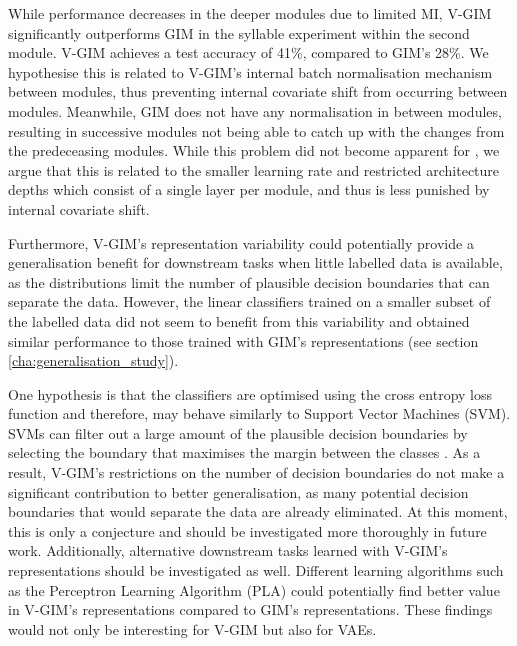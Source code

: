 	While performance decreases in the deeper modules due to limited MI, V-GIM significantly outperforms GIM in the syllable experiment within the second module. V-GIM achieves a test accuracy of 41\%, compared to GIM's 28\%. We hypothesise this is related to V-GIM's internal batch normalisation mechanism between modules, thus preventing internal covariate shift from occurring between modules. Meanwhile, GIM does not have any normalisation in between modules, resulting in successive modules not being able to catch up with the changes from the predeceasing modules. While this problem did not become apparent for \citeauthor{lowePuttingEndEndtoEnd2020a}, we argue that this is related to the smaller learning rate and restricted architecture depths which consist of a single layer per module, and thus is less punished by internal covariate shift.
			
	Furthermore, V-GIM's representation variability could potentially provide a generalisation benefit for downstream tasks when little labelled data is available, as the distributions limit the number of plausible decision boundaries that can separate the data. However, the linear classifiers trained on a smaller subset of the labelled data did not seem to benefit from this variability and obtained similar performance to those trained with GIM's representations (see section \ref{cha:generalisation_study}). 
	
	One hypothesis is that the classifiers are optimised using the cross entropy loss function and therefore, may behave similarly to Support Vector Machines (SVM). SVMs can filter out a large amount of the plausible decision boundaries by selecting the boundary that maximises the margin between the classes \citep{hearstSupportVectorMachines1998, nobleWhatSupportVector2006}. As a result, V-GIM's restrictions on the number of decision boundaries do not make a significant contribution to better generalisation, as many potential decision boundaries that would separate the data are already eliminated. At this moment, this is only a conjecture and should be investigated more thoroughly in future work. Additionally, alternative downstream tasks learned with V-GIM's representations should be investigated as well. Different learning algorithms such as the Perceptron Learning Algorithm (PLA) could potentially find better value in V-GIM's representations compared to GIM's representations. These findings would not only be interesting for V-GIM but also for VAEs.
	
